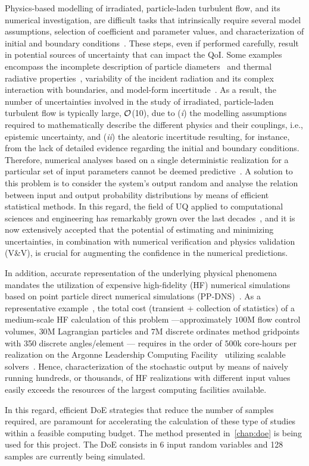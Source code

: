 Physics-based modelling of irradiated, particle-laden turbulent flow, and its numerical investigation, are difficult tasks that intrinsically require several model assumptions, selection of coefficient and parameter values, and characterization of initial and boundary conditions~\citep{Jofre2017-A}.
These steps, even if performed carefully, result in potential sources of uncertainty that can impact the QoI.
Some examples encompass the incomplete description of particle diameters~\citep{Rahmani2018-A} and thermal radiative properties~\citep{Frankel2017-A}, variability of the incident radiation and its complex interaction with boundaries, and model-form incertitude~\citep{Jofre2018-A}.
As a result, the number of uncertainties involved in the study of irradiated, particle-laden turbulent flow is typically large, ${\cal O}$(10), due to (\emph{i}) the modelling assumptions required to mathematically describe the different physics and their couplings, i.e., epistemic uncertainty, and (\emph{ii}) the aleatoric incertitude resulting, for instance, from the lack of detailed evidence regarding the initial and boundary conditions.
Therefore, numerical analyses based on a single deterministic realization for a particular set of input parameters cannot be deemed predictive~\citep{Roache1997-A}.
A solution to this problem is to consider the system's output random and analyse the relation between input and output probability distributions by means of efficient statistical methods.
In this regard, the field of UQ applied to computational sciences and engineering has remarkably grown over the last decades~\citep{Najm2009-A,Chernatynskiy2013-A,Beran2017-A}, and it is now extensively accepted that the potential of estimating and minimizing uncertainties, in combination with numerical verification and physics validation (V\&V), is crucial for augmenting the confidence in the numerical predictions.

In addition, accurate representation of the underlying physical phenomena mandates the utilization of expensive high-fidelity (HF) numerical simulations based on point particle direct numerical simulations (PP-DNS)~\citep{Subramaniam2013-A}.
As a representative example~\citep{Jofre2017-A}, the total cost (transient + collection of statistics) of a medium-scale HF calculation of this problem ---\thinspace approximately $100$M flow control volumes, $30$M Lagrangian particles and $7$M discrete ordinates method gridpoints with 350 discrete angles/element \thinspace--- requires in the order of $500$k core-hours per realization on the Argonne Leadership Computing Facility~\citep{Mira-O} utilizing scalable solvers~\citep{Esmaily2018-A}.
Hence, characterization of the stochastic output by means of naively running hundreds, or thousands, of HF realizations with different input values easily exceeds the resources of the largest computing facilities available.

In this regard, efficient DoE strategies that reduce the number of samples required, are paramount for accelerating the calculation of these type of studies within a feasible computing budget. The method presented in~\cref{chap:doe} is being used for this project. The DoE consists in 6 input random variables and 128 samples are currently being simulated.


